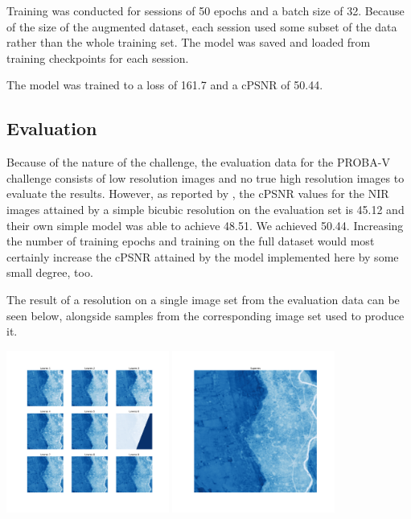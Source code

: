\documentclass{article}
\begin{document}
Training was conducted for sessions of 50 epochs and a batch size of 32. Because of the size of the augmented dataset, each session used some subset of the data rather than the whole training set. The model was saved and loaded from training checkpoints for each session.

The model was trained to a loss of 161.7 and a cPSNR of 50.44.

\subsection{Evaluation}

Because of the nature of the challenge, the evaluation data for the PROBA-V challenge consists of low resolution images and no true high resolution images to evaluate the results. However, as reported by \citet{salvetti2020multi}, the cPSNR values for the NIR images attained by a simple bicubic resolution on the evaluation set is 45.12 and their own simple model was able to achieve 48.51. We achieved 50.44. Increasing the number of training epochs and training on the full dataset would most certainly increase the cPSNR attained by the model implemented here by some small degree, too. 

The result of a resolution on a single image set from the evaluation data can be seen below, alongside samples from the corresponding image set used to produce it.

\begin{center}
    \includegraphics[width=0.4\textwidth]{low_res_inputs.png}
    \includegraphics[width=0.4\textwidth]{super_res_output.png}
\end{center}
\end{document}

